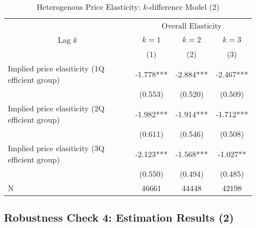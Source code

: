 \documentclass[ review  , 3p ]{elsarticle}
\begin{document}
  \begin{table}
  
  \caption{\label{tab:kableHeterokDiffElasticitySlide2}Heterogenous Price Elasticity: $k$-difference Model (2)}
  \centering
  \fontsize{8}{10}\selectfont
  \begin{tabular}[t]{lccc}
  \toprule
  \multicolumn{1}{c}{ } & \multicolumn{3}{c}{Overall Elasticity} \\
  \cmidrule(l{3pt}r{3pt}){2-4}
  \multicolumn{1}{c}{Lag $k$} & \multicolumn{1}{c}{$k = 1$} & \multicolumn{1}{c}{$k = 2$} & \multicolumn{1}{c}{$k = 3$} \\
  \cmidrule(l{3pt}r{3pt}){1-1} \cmidrule(l{3pt}r{3pt}){2-2} \cmidrule(l{3pt}r{3pt}){3-3} \cmidrule(l{3pt}r{3pt}){4-4}
   & (1) & (2) & (3)\\
  \midrule
  Implied price elasiticity (1Q efficient group) & -1.778*** & -2.884*** & -2.467***\\
   & (0.553) & (0.520) & (0.509)\\
  Implied price elasiticity (2Q efficient group) & -1.982*** & -1.914*** & -1.712***\\
   & (0.611) & (0.546) & (0.508)\\
  Implied price elasiticity (3Q efficient group) & -2.123*** & -1.568*** & -1.027**\\
   & (0.550) & (0.494) & (0.485)\\
  N & 46661 & 44448 & 42198\\
  \bottomrule
  \end{tabular}
  \end{table}
  
  \hypertarget{robustness-check-4-estimation-results-2}{%
  \subsection{Robustness Check 4: Estimation Results (2)}\label{robustness-check-4-estimation-results-2}}
  
\end{document}
